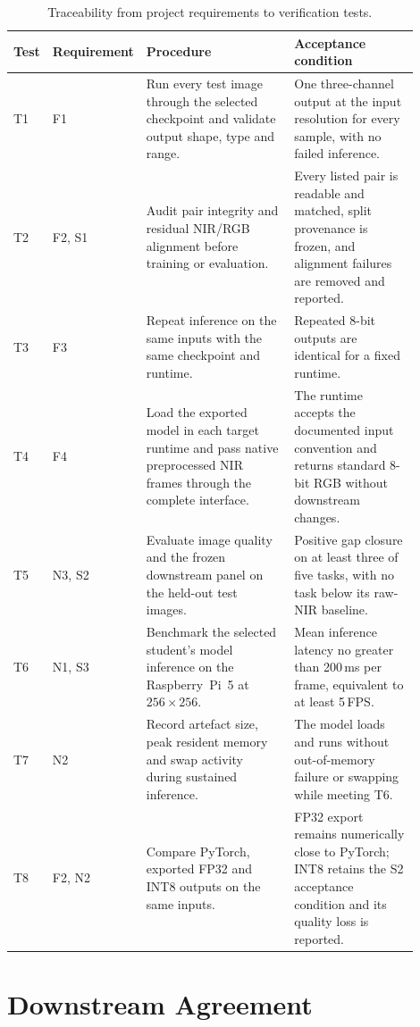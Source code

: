 \begin{table}[H]
\centering
\scriptsize
\setlength{\tabcolsep}{3pt}
\begin{tabular}{p{0.07\linewidth}p{0.13\linewidth}p{0.38\linewidth}p{0.32\linewidth}}
\hline
\textbf{Test} & \textbf{Requirement} & \textbf{Procedure} & \textbf{Acceptance condition} \\
\hline
T1 & F1 & Run every test image through the selected checkpoint and validate output shape, type and range. & One three-channel output at the input resolution for every sample, with no failed inference. \\
T2 & F2, S1 & Audit pair integrity and residual NIR/RGB alignment before training or evaluation. & Every listed pair is readable and matched, split provenance is frozen, and alignment failures are removed and reported. \\
T3 & F3 & Repeat inference on the same inputs with the same checkpoint and runtime. & Repeated 8-bit outputs are identical for a fixed runtime. \\
T4 & F4 & Load the exported model in each target runtime and pass native preprocessed NIR frames through the complete interface. & The runtime accepts the documented input convention and returns standard 8-bit RGB without downstream changes. \\
T5 & N3, S2 & Evaluate image quality and the frozen downstream panel on the held-out test images. & Positive gap closure on at least three of five tasks, with no task below its raw-NIR baseline. \\
T6 & N1, S3 & Benchmark the selected student's model inference on the Raspberry~Pi~5 at $256\times256$. & Mean inference latency no greater than 200\,ms per frame, equivalent to at least 5\,FPS. \\
T7 & N2 & Record artefact size, peak resident memory and swap activity during sustained inference. & The model loads and runs without out-of-memory failure or swapping while meeting T6. \\
T8 & F2, N2 & Compare PyTorch, exported FP32 and INT8 outputs on the same inputs. & FP32 export remains numerically close to PyTorch; INT8 retains the S2 acceptance condition and its quality loss is reported. \\
\hline
\end{tabular}
\caption{Traceability from project requirements to verification tests.}
\label{tab:test_matrix}
\end{table}


\section{Downstream Agreement}
\label{sec:test_downstream}

